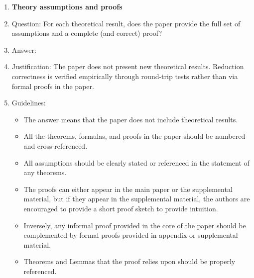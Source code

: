 \begin{enumerate}
\item {\bf Theory assumptions and proofs}
    \item[] Question: For each theoretical result, does the paper provide the full set of assumptions and a complete (and correct) proof?
    \item[] Answer: \answerNA{}
    \item[] Justification: The paper does not present new theoretical results. Reduction correctness is verified empirically through round-trip tests rather than via formal proofs in the paper.
    \item[] Guidelines:
    \begin{itemize}
        \item The answer \answerNA{} means that the paper does not include theoretical results.
        \item All the theorems, formulas, and proofs in the paper should be numbered and cross-referenced.
        \item All assumptions should be clearly stated or referenced in the statement of any theorems.
        \item The proofs can either appear in the main paper or the supplemental material, but if they appear in the supplemental material, the authors are encouraged to provide a short proof sketch to provide intuition.
        \item Inversely, any informal proof provided in the core of the paper should be complemented by formal proofs provided in appendix or supplemental material.
        \item Theorems and Lemmas that the proof relies upon should be properly referenced.
    \end{itemize}


\end{enumerate}
